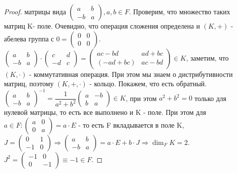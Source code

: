 \begin{proof}
	матрицы вида \(\begin{pmatrix}
		a & b \\
		-b & a
	\end{pmatrix}, a,b \in F\). Проверим, что множество таких матриц K- поле. Очевидно, что операция сложения определена и \((K, +)\) - абелева группа с \(0 = \begin{pmatrix}
	0 & 0 \\ 0 & 0
	\end{pmatrix}\).\newline
	 \(\begin{pmatrix}
	a & b \\ -b & a
	\end{pmatrix}\cdot \begin{pmatrix}
	c & d \\ -d & c
	\end{pmatrix} = \begin{pmatrix}
	ac-bd & ad+bc \\
	(-ad+bc) & ac-bd
	\end{pmatrix}\in K\), заметим, что \((K, \cdot)\) - коммутативная операция.\newline
	 При этом мы знаем о дистрибутивности матриц, поэтому \((K, +, \cdot)\) - кольцо. Покажем, что есть обратный. \(\begin{pmatrix}
	a & b \\ -b & a
	\end{pmatrix}^{-1} = \dfrac{1}{a^2+b^2}\begin{pmatrix}
	a & -b \\ b & a
	\end{pmatrix}\in K\), при этом \(a^2+b^2=0\) только для нулевой матрицы, то есть все выполнено и K - поле.\newline
	 При этом для \(a\in F: \begin{pmatrix}
	a & 0 \\ 0 & a
	\end{pmatrix} = a\cdot E\) - то есть F вкладывается в поле K,\( J = \begin{pmatrix}
	0 & 1 \\ -1 & 0
	\end{pmatrix} \Longrightarrow \begin{pmatrix}
	a & b \\ -b & a
	\end{pmatrix} = a\cdot E + b\cdot J\Longrightarrow \dim_FK = 2\). \(J^2 = \begin{pmatrix}
	-1 & 0 \\ 0 & -1
	\end{pmatrix}\equiv -1\in F\).
\end{proof}
